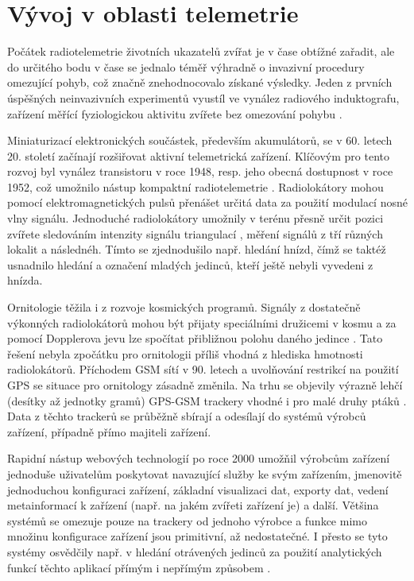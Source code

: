 \section{Vývoj v oblasti telemetrie}

Počátek radiotelemetrie životních ukazatelů zvířat je v čase obtížné zařadit, ale do určitého bodu v čase se jednalo téměř výhradně o invazivní procedury omezující pohyb, což značně znehodnocovalo získané výsledky. Jeden z prvních úspěšných neinvazivních experimentů vyustíl ve vynález radiového induktografu, zařízení měřící fyziologickou aktivitu zvířete bez omezování pohybu \cite{fuller1948radio}.

Miniaturizací elektronických součástek, především akumulátorů, se v 60. letech 20. století začínají rozšiřovat aktivní telemetrická zařízení. Klíčovým pro tento rozvoj byl vynález transistoru v roce 1948, resp. jeho obecná dostupnost v roce 1952, což umožnilo nástup kompaktní radiotelemetrie \cite{amlaner2013handbook}. Radiolokátory mohou pomocí elektromagnetických pulsů přenášet určitá data za použití modulací nosné vlny signálu. Jednoduché radiolokátory umožnily v terénu přesně určit pozici zvířete sledováním intenzity signálu triangulací \cite{Farve2014}, měření signálů z tří různých lokalit a následnéh. Tímto se zjednodušilo např. hledání hnízd, čímž se taktéž usnadnilo hledání a označení mladých jedinců, kteří ještě nebyli vyvedeni z hnízda.


Ornitologie těžila i z rozvoje kosmických programů. Signály z dostatečně výkonných radiolokátorů mohou být přijaty speciálními družicemi v kosmu a za pomocí Dopplerova jevu lze spočítat přibližnou polohu daného jedince \cite{Farve2014}. Tato řešení nebyla zpočátku pro ornitologii příliš vhodná z hlediska hmotnosti radiolokátorů. Příchodem GSM sítí v 90. letech a uvolňování restrikcí na použití GPS se situace pro ornitology zásadně změnila. Na trhu se objevily výrazně lehčí (desítky až jednotky gramů) GPS-GSM trackery vhodné i pro malé druhy ptáků \cite{sokolov2011modern}. Data z těchto trackerů se průběžně sbírají a odesílají do systémů výrobců zařízení, případně přímo majiteli zařízení.

Rapidní nástup webových technologií po roce 2000 umožňil výrobcům zařízení jednoduše uživatelům poskytovat navazující služby ke svým zařízením, jmenovitě jednoduchou konfiguraci zařízení, základní visualizaci dat, exporty dat, vedení metainformací k zařízení (např. na jakém zvířeti zařízení je) a další. Většina systémů se omezuje pouze na trackery od jednoho výrobce a funkce mimo množinu konfigurace zařízení jsou primitivní, až nedostatečné. I přesto se tyto systémy osvědčily např. v hledání otrávených jedinců za použití analytických funkcí těchto aplikací přímým i nepřímým způsobem \cite{stoynov2018early}.

